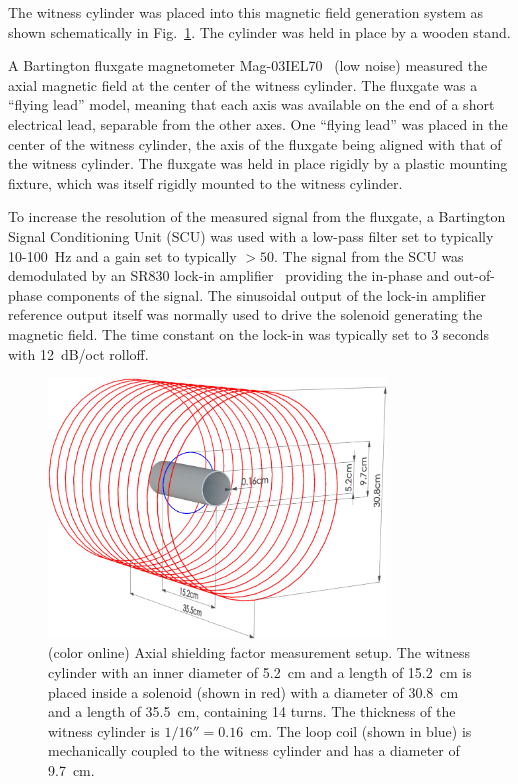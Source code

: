 The witness cylinder was placed into this magnetic field generation
system as shown schematically in Fig.~\ref{fig:geometry}.  The
cylinder was held in place by a wooden stand.

A Bartington fluxgate magnetometer Mag-03IEL70~\cite{bib:bartman} (low
noise) measured the axial magnetic field at the center of the witness
cylinder.  The fluxgate was a ``flying lead'' model, meaning that each
axis was available on the end of a short electrical lead, separable
from the other axes.  One ``flying lead'' was placed in the center of
the witness cylinder, the axis of the fluxgate being aligned with that
of the witness cylinder.  The fluxgate was held in place rigidly by a
plastic mounting fixture, which was itself rigidly mounted to the
witness cylinder.

To increase the resolution of the measured signal from the fluxgate, a
Bartington Signal Conditioning Unit (SCU) was used with a low-pass
filter set to typically 10-100~Hz and a gain set to typically $>50$.
The signal from the SCU was demodulated by an SR830 lock-in
amplifier~\cite{bib:lockin} providing the in-phase and out-of-phase
components of the signal.  The sinusoidal output of the lock-in
amplifier reference output itself was normally used to drive the
solenoid generating the magnetic field.  The time constant on the
lock-in was typically set to 3 seconds with 12~dB/oct rolloff.

\begin{figure}
  \begin{center}
    \includegraphics[width=0.8\textwidth]{to_jeff_new4.pdf}
    \caption{(color online) Axial shielding factor measurement
      setup. The witness cylinder with an inner diameter of 5.2~cm and
      a length of 15.2~cm is placed inside a solenoid (shown in red)
      with a diameter of 30.8~cm and a length of 35.5~cm, containing
      14 turns.  The thickness of the witness cylinder is
      $1/16''=0.16$~cm.  The loop coil (shown in blue) is mechanically
      coupled to the witness cylinder and has a diameter of 9.7~cm.}
    \label{fig:geometry}
  \end{center}
\end{figure}

